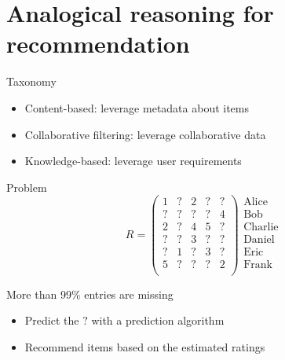 \documentclass{beamer}
\begin{document}
\section[Application to recommendation]{Analogical reasoning for recommendation}

\begin{frame}{Taxonomy}
  \begin{itemize}
    \item Content-based: leverage metadata about items
    \item \alert{Collaborative filtering}: leverage collaborative data
    \item Knowledge-based: leverage user requirements
  \end{itemize}
\end{frame}

\begin{frame}{Problem}
$$
R= \begin{pmatrix}
1 & ? & 2 & ? & ?\\
? & ? & ? & ? & 4\\
2 & ? & 4 & 5 & ?\\
? & ? & 3 & ? & ?\\
? & 1 & ? & 3 & ?\\
5 & ? & ? & ? & 2\\
\end{pmatrix}
\begin{matrix}
\text{Alice}\\
\text{Bob}\\
\text{Charlie}\\
\text{Daniel}\\
\text{Eric}\\
\text{Frank}\\
\end{matrix}
$$

More than 99\% entries are missing
\begin{itemize}
  \item Predict the $?$ with a prediction algorithm
  \item Recommend items based on the estimated ratings
\end{itemize}
\end{frame}
\end{document}

